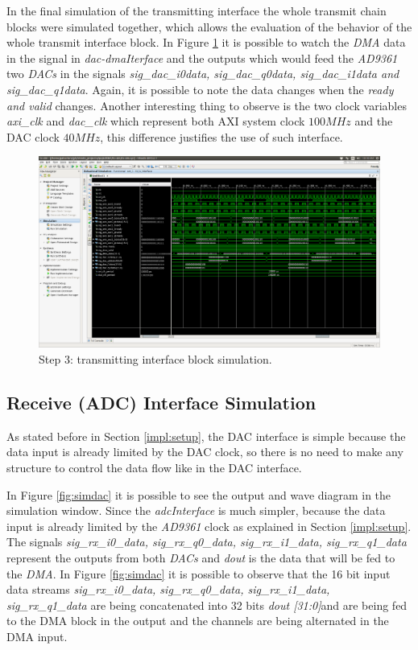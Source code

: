 In the final simulation of the transmitting interface the whole transmit chain
blocks were simulated together, which allows the evaluation of the behavior of
the whole transmit interface block. In Figure \ref{fig:simtxif} it is possible
to watch the \textit{DMA} data in the signal in \textit{dac-dmaIterface} and the
outputs which would feed the \textit{AD9361} two \textit{DACs} in the signals
\textit{sig\_dac\_i0data, sig\_dac\_q0data, sig\_dac\_i1data and
sig\_dac\_q1data}. Again, it is possible to note the data changes when the
\textit{ready and valid} changes. Another interesting thing to observe is the
two clock variables \textit{axi\_clk} and \textit{dac\_clk} which represent both
AXI system clock $ 100 MHz$ and the DAC clock $40 MHz$, this difference
justifies the use of such interface.


\begin{figure}[htbp]
    \centering
    \includegraphics[width=1\textwidth,
    trim={{.67\textwidth} {.7\textwidth} {.05\textwidth} {.3\textwidth}},
    clip]{./figures/txInterface}
    \caption{ Step 3: transmitting interface block simulation.
    \label{fig:simtxif}}
\end{figure}

\subsection{Receive (ADC) Interface Simulation}

As stated before in Section \ref{impl:setup}, the DAC interface is simple
because the data input is already limited by the DAC clock, so there is no need
to make any structure to control the data flow like in the DAC interface.

In Figure \ref{fig:simdac} it is possible to see the output and wave diagram in
the simulation window. Since the \textit{adcInterface} is much simpler, because
the data input is already limited by the \textit{AD9361} clock as explained in
Section \ref{impl:setup}. The signals \textit{sig\_rx\_i0\_data,
sig\_rx\_q0\_data, sig\_rx\_i1\_data, sig\_rx\_q1\_data} represent the outputs
from both \textit{DACs} and \textit{dout} is the data that will be fed to the
\textit{DMA}. In Figure \ref{fig:simdac} it is possible to observe that the 16
bit input data streams \textit{sig\_rx\_i0\_data, sig\_rx\_q0\_data,
sig\_rx\_i1\_data, sig\_rx\_q1\_data} are being concatenated into 32 bits
\textit{dout [31:0]}and are being fed to the DMA block in the output and the
channels are being alternated in the DMA input.

